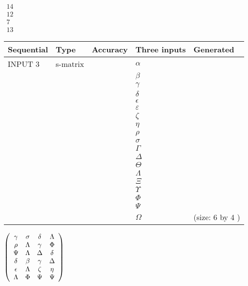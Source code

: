 \documentclass[12pt]{article}
\begin{document}
   
 $\begin{array}{
 c
 }
          14  \\ 
          12  \\ 
           7  \\ 
          13
\end{array}  $ 
  
  
\noindent\begin{tabular}{|l|l|l|l|l|}
\hline
 Sequential & Type & Accuracy & Three inputs & Generated \\ 
\hline
 
 
  INPUT $            3 $ & s-matrix & & 
 $  \alpha $ & 
  \\
  & & & 
 $  \beta $ & 
  \\
  & & & 
 $  \gamma $ & 
  \\
  & & & 
 $  \delta $ & 
  \\
  & & & 
 $  \epsilon $ & 
  \\
  & & & 
 $  \varepsilon $ & 
  \\
  & & & 
 $                     \zeta $ & 
  \\
  & & & 
 $  \eta $ & 
  \\
  & & & 
 $  \rho $ & 
  \\
  & & & 
 $  \sigma $ & 
  \\
  & & & 
 $  \Gamma $ & 
  \\
  & & & 
 $  \Delta $ & 
  \\
  & & & 
 $  \Theta $ & 
  \\
  & & & 
 $  \Lambda $ & 
  \\
  & & & 
 $                     \Xi $ & 
  \\
  & & & 
 $  \Upsilon $ & 
  \\
  & & & 
 $  \Phi $ & 
  \\
  & & & 
 $  \Psi $ & 
  \\
  & & & 
 $  \Omega $ & 
  (size:            6  by            4 )
 \\  \hline  
 \end{tabular}
   
   
 $  \left( \begin{array}
 {
 c
 c
 c
 c
 }
 \gamma & 
 \sigma & 
 \delta & 
 \Lambda \\ 
 \rho & 
 \Lambda & 
 \gamma & 
 \Phi \\ 
 \Psi & 
 \Lambda & 
 \Delta & 
 \delta \\ 
 \delta & 
 \beta & 
 \gamma & 
 \Delta \\ 
 \epsilon & 
 \Lambda & 
                    \zeta & 
 \eta \\ 
 \Lambda & 
 \Phi & 
 \Psi & 
 \Psi
 \end{array} \right) $ 
  
\end{document}
